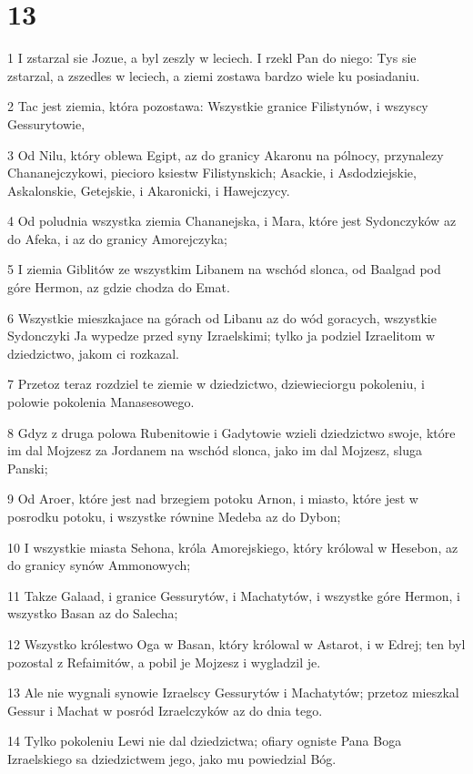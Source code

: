 \chapter{13}

\par 1 I zstarzal sie Jozue, a byl zeszly w leciech. I rzekl Pan do niego: Tys sie zstarzal, a zszedles w leciech, a ziemi zostawa bardzo wiele ku posiadaniu.
\par 2 Tac jest ziemia, która pozostawa: Wszystkie granice Filistynów, i wszyscy Gessurytowie,
\par 3 Od Nilu, który oblewa Egipt, az do granicy Akaronu na pólnocy, przynalezy Chananejczykowi, piecioro ksiestw Filistynskich; Asackie, i Asdodziejskie, Askalonskie, Getejskie, i Akaronicki, i Hawejczycy.
\par 4 Od poludnia wszystka ziemia Chananejska, i Mara, które jest Sydonczyków az do Afeka, i az do granicy Amorejczyka;
\par 5 I ziemia Giblitów ze wszystkim Libanem na wschód slonca, od Baalgad pod góre Hermon, az gdzie chodza do Emat.
\par 6 Wszystkie mieszkajace na górach od Libanu az do wód goracych, wszystkie Sydonczyki Ja wypedze przed syny Izraelskimi; tylko ja podziel Izraelitom w dziedzictwo, jakom ci rozkazal.
\par 7 Przetoz teraz rozdziel te ziemie w dziedzictwo, dziewieciorgu pokoleniu, i polowie pokolenia Manasesowego.
\par 8 Gdyz z druga polowa Rubenitowie i Gadytowie wzieli dziedzictwo swoje, które im dal Mojzesz za Jordanem na wschód slonca, jako im dal Mojzesz, sluga Panski;
\par 9 Od Aroer, które jest nad brzegiem potoku Arnon, i miasto, które jest w posrodku potoku, i wszystke równine Medeba az do Dybon;
\par 10 I wszystkie miasta Sehona, króla Amorejskiego, który królowal w Hesebon, az do granicy synów Ammonowych;
\par 11 Takze Galaad, i granice Gessurytów, i Machatytów, i wszystke góre Hermon, i wszystko Basan az do Salecha;
\par 12 Wszystko królestwo Oga w Basan, który królowal w Astarot, i w Edrej; ten byl pozostal z Refaimitów, a pobil je Mojzesz i wygladzil je.
\par 13 Ale nie wygnali synowie Izraelscy Gessurytów i Machatytów; przetoz mieszkal Gessur i Machat w posród Izraelczyków az do dnia tego.
\par 14 Tylko pokoleniu Lewi nie dal dziedzictwa; ofiary ogniste Pana Boga Izraelskiego sa dziedzictwem jego, jako mu powiedzial Bóg.
